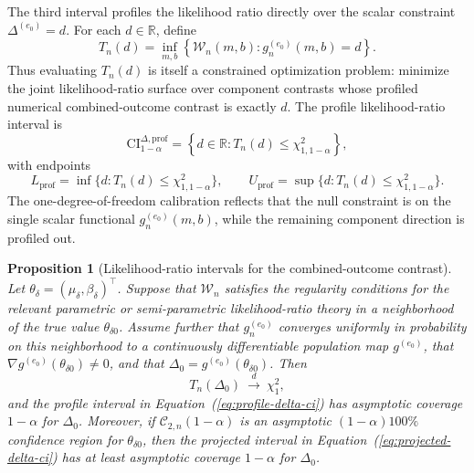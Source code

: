 \documentclass[11pt]{article}
\newtheorem{proposition}{Proposition}
\begin{document}
The third interval profiles the likelihood ratio directly over the scalar constraint $\Delta^{(e_0)}=d$. For each $d\in\mathbb{R}$, define
\begin{equation}
  T_n(d)
  =
  \inf_{m,b}
  \left\{
    \mathcal{W}_n(m,b):
    g_n^{(e_0)}(m,b)=d
  \right\}.
  \label{eq:delta-profile-stat-section}
\end{equation}
Thus evaluating $T_n(d)$ is itself a constrained optimization problem: minimize the joint likelihood-ratio surface over component contrasts whose profiled numerical combined-outcome contrast is exactly $d$. The profile likelihood-ratio interval is
\begin{equation}
  \mathrm{CI}^{\Delta,\mathrm{prof}}_{1-\alpha}
  =
  \left\{
    d\in\mathbb{R}: T_n(d)\leq\chi^2_{1,1-\alpha}
  \right\},
  \label{eq:profile-delta-ci}
\end{equation}
with endpoints
\[
  L_{\mathrm{prof}}
  =
  \inf\{d:T_n(d)\leq\chi^2_{1,1-\alpha}\},
  \qquad
  U_{\mathrm{prof}}
  =
  \sup\{d:T_n(d)\leq\chi^2_{1,1-\alpha}\}.
\]
The one-degree-of-freedom calibration reflects that the null constraint is on the single scalar functional $g_n^{(e_0)}(m,b)$, while the remaining component direction is profiled out.

\begin{proposition}[Likelihood-ratio intervals for the combined-outcome contrast]\label{prop:delta-lr-intervals}
Let $\theta_\delta=(\mu_\delta,\beta_\delta)^\top$. Suppose that $\mathcal{W}_n$ satisfies the regularity conditions for the relevant parametric or semi-parametric likelihood-ratio theory in a neighborhood of the true value $\theta_{\delta0}$. Assume further that $g_n^{(e_0)}$ converges uniformly in probability on this neighborhood to a continuously differentiable population map $g^{(e_0)}$, that $\nabla g^{(e_0)}(\theta_{\delta0})\neq 0$, and that $\Delta_0=g^{(e_0)}(\theta_{\delta0})$. Then
\[
  T_n(\Delta_0)\ \overset{d}{\longrightarrow}\ \chi^2_1,
\]
and the profile interval in Equation~(\ref{eq:profile-delta-ci}) has asymptotic coverage $1-\alpha$ for $\Delta_0$. Moreover, if $\mathcal{C}_{2,n}(1-\alpha)$ is an asymptotic $(1-\alpha)100\%$ confidence region for $\theta_{\delta0}$, then the projected interval in Equation~(\ref{eq:projected-delta-ci}) has at least asymptotic coverage $1-\alpha$ for $\Delta_0$.
\end{proposition}
\end{document}
